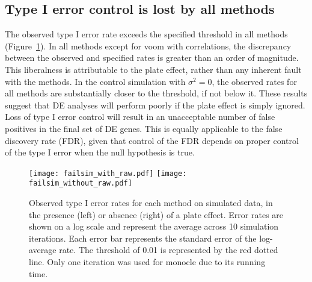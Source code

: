 \documentclass{article}
\begin{document}

\subsection{Type I error control is lost by all methods}
The observed type I error rate exceeds the specified threshold in all methods (Figure~\ref{fig:platefail}).
In all methods except for voom with correlations, the discrepancy between the observed and specified rates is greater than an order of magnitude.
This liberalness is attributable to the plate effect, rather than any inherent fault with the methods.
In the control simulation with $\sigma^2=0$, the observed rates for all methods are substantially closer to the threshold, if not below it.
These results suggest that DE analyses will perform poorly if the plate effect is simply ignored.
Loss of type I error control will result in an unacceptable number of false positives in the final set of DE genes.
This is equally applicable to the false discovery rate (FDR), given that control of the FDR depends on proper control of the type I error when the null hypothesis is true.

\begin{figure}[tbp]
\begin{center}
\texttt{[image: failsim\_with\_raw.pdf]}
\texttt{[image: failsim\_without\_raw.pdf]}
\end{center}
\caption{
    Observed type I error rates for each method on simulated data, in the presence (left) or absence (right) of a plate effect.
    Error rates are shown on a log scale and represent the average across 10 simulation iterations.
    Each error bar represents the standard error of the log-average rate.
    The threshold of 0.01 is represented by the red dotted line.
    Only one iteration was used for monocle due to its running time.
}
\label{fig:platefail}
\end{figure}
\end{document}

